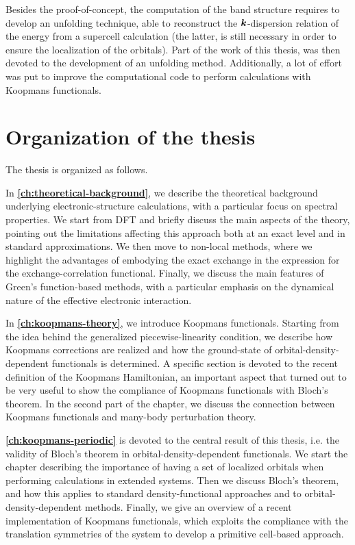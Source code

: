 Besides the proof-of-concept, the computation of the band structure requires to develop an unfolding technique, able to reconstruct the ${\bm k}$-dispersion relation of the energy from a supercell calculation (the latter, is still necessary in order to ensure the localization of the orbitals). Part of the work of this thesis, was then devoted to the development of an unfolding method. 
Additionally, a lot of effort was put to improve the computational code to perform calculations with Koopmans functionals.

\section{Organization of the thesis\label{sec:organization-thesis}}
The thesis is organized as follows.

In \textbf{\cref{ch:theoretical-background}}, we describe the theoretical background underlying electronic-structure calculations, with a particular focus on spectral properties. We start from DFT and briefly discuss the main aspects of the theory, pointing out the limitations affecting this approach both at an exact level and in standard approximations. We then move to non-local methods, where we highlight the advantages of embodying the exact exchange in the expression for the exchange-correlation functional. Finally, we discuss the main features of Green's function-based methods, with a particular emphasis on the dynamical nature of the effective electronic interaction.

In \textbf{\cref{ch:koopmans-theory}}, we introduce Koopmans functionals. Starting from the idea behind the generalized piecewise-linearity condition, we describe how Koopmans corrections are realized and how the ground-state of orbital-density-dependent functionals is determined. A specific section is devoted to the recent definition of the Koopmans Hamiltonian, an important aspect that turned out to be very useful to show the compliance of Koopmans functionals with Bloch's theorem. In the second part of the chapter, we discuss the connection between Koopmans functionals and many-body perturbation theory.

\textbf{\cref{ch:koopmans-periodic}} is devoted to the central result of this thesis, i.e. the validity of Bloch's theorem in orbital-density-dependent functionals. We start the chapter describing the importance of having a set of localized orbitals when performing calculations in extended systems. Then we discuss Bloch's theorem, and how this applies to standard density-functional approaches and to orbital-density-dependent methods. Finally, we give an overview of a recent implementation of Koopmans functionals, which exploits the compliance with the translation symmetries of the system to develop a primitive cell-based approach.

